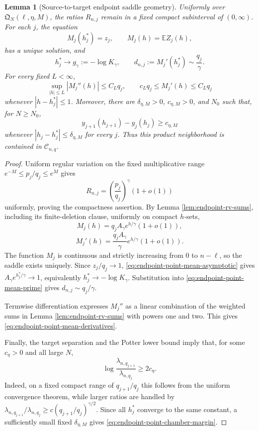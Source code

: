 \documentclass[11pt]{article}
\newtheorem{lemma}[theorem]{Lemma}
\theoremstyle{remark}
\newcommand{\Ee}{\mathbb E}
\begin{document}
\begin{lemma}[Source-to-target endpoint saddle geometry]
\label{lem:endpoint-point-saddle}
Uniformly over $\mathfrak Q_N(\ell,\eta,M)$, the ratios $R_{n,j}$ remain in a
fixed compact subinterval of $(0,\infty)$.  For each $j$, the equation
\[
        M_j(h_j^*)=z_j,
        \qquad
        M_j(h)=\Ee Z_j(h),
\tag{10.3}\label{eq:endpoint-point-saddle-equation}
\]
has a unique solution, and
\[
        h_j^*\longrightarrow g_\gamma:=-\log K_\gamma,
        \qquad
        d_{n,j}:=M_j'(h_j^*)\sim\frac{q_j}{\gamma}.
\tag{10.4}\label{eq:endpoint-point-saddle-asymptotics}
\]
For every fixed $L<\infty$,
\[
        \sup_{|h|\le L}|M_j''(h)|\le C_Lq_j,
        \qquad
        c_Lq_j\le M_j'(h)\le C_Lq_j
\tag{10.5}\label{eq:endpoint-point-mean-derivatives}
\]
whenever $|h-h_j^*|\le1$.  Moreover, there are
$\delta_{\eta,M}>0$, $c_{\eta,M}>0$, and $N_0$ such that, for $N\ge N_0$,
\[
        y_{j+1}(h_{j+1})-y_j(h_j)\ge c_{\eta,M}
\tag{10.6}\label{eq:endpoint-point-chamber-margin}
\]
whenever $|h_j-h_j^*|\le\delta_{\eta,M}$ for every $j$.  Thus this product
neighborhood is contained in $\mathscr C_{n,q}$.
\end{lemma}

\begin{proof}
Uniform regular variation on the fixed multiplicative range
$e^{-M}\le p_j/q_j\le e^M$ gives
\[
        R_{n,j}
        =\left(\frac{p_j}{q_j}\right)^\gamma(1+o(1))
\tag{10.7}\label{eq:endpoint-point-rate-ratio}
\]
uniformly, proving the compactness assertion.  By Lemma
\ref{lem:endpoint-rv-sums}, including its finite-deletion clause, uniformly on
compact $h$-sets,
\[
        M_j(h)=q_jA_\gamma e^{h/\gamma}(1+o(1)),
\tag{10.8}\label{eq:endpoint-point-mean-asymptotic}
\]
\[
        M_j'(h)=\frac{q_jA_\gamma}{\gamma}
        e^{h/\gamma}(1+o(1)).
\tag{10.9}\label{eq:endpoint-point-mean-prime}
\]
The function $M_j$ is continuous and strictly increasing from $0$ to
$n-\ell$, so the saddle exists uniquely.  Since $z_j/q_j\to1$,
\eqref{eq:endpoint-point-mean-asymptotic} gives
$A_\gamma e^{h_j^*/\gamma}\to1$, equivalently
$h_j^*\to-\log K_\gamma$.  Substitution into
\eqref{eq:endpoint-point-mean-prime} gives
$d_{n,j}\sim q_j/\gamma$.

Termwise differentiation expresses $M_j''$ as a linear combination of the
weighted sums in Lemma \ref{lem:endpoint-rv-sums} with powers one and two.
This gives \eqref{eq:endpoint-point-mean-derivatives}.

Finally, the target separation and the Potter lower bound imply that, for some
$c_\eta>0$ and all large $N$,
\[
        \log\frac{\lambda_{n,q_{j+1}}}{\lambda_{n,q_j}}
        \ge2c_\eta.
\tag{10.10}\label{eq:endpoint-point-rate-gap}
\]
Indeed, on a fixed compact range of $q_{j+1}/q_j$ this follows from the uniform
convergence theorem, while larger ratios are handled by
$\lambda_{n,q_{j+1}}/\lambda_{n,q_j}
 \ge c(q_{j+1}/q_j)^{\gamma/2}$.
Since all $h_j^*$ converge to the same constant, a sufficiently small fixed
$\delta_{\eta,M}$ gives \eqref{eq:endpoint-point-chamber-margin}.
\end{proof}
\end{document}
